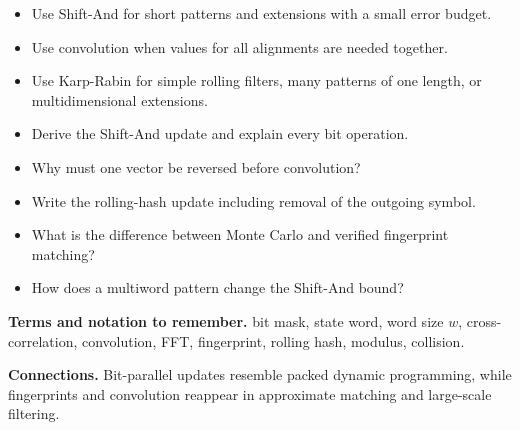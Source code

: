 \documentclass[11pt]{article}
\begin{document}
\begin{tcolorbox}[enhanced,breakable,title={Algorithm selection / when to use this},
  colback=Primary!3,colframe=Primary,fonttitle=\small\sffamily\bfseries,fontupper=\footnotesize,
  boxsep=0.6mm,left=1.5mm,right=1.5mm,top=1mm,bottom=1mm,before skip=3pt,after skip=3pt]
\begin{itemize}
  \item Use Shift-And for short patterns and extensions with a small error budget.
  \item Use convolution when values for all alignments are needed together.
  \item Use Karp-Rabin for simple rolling filters, many patterns of one length, or multidimensional extensions.
\end{itemize}
\end{tcolorbox}

\begin{tcolorbox}[enhanced,breakable,title={Self-test questions},
  colback=white,colframe=Accent,fonttitle=\small\sffamily\bfseries,fontupper=\footnotesize,
  boxsep=0.6mm,left=1.5mm,right=1.5mm,top=1mm,bottom=1mm,before skip=3pt,after skip=3pt]
\begin{itemize}
  \item Derive the Shift-And update and explain every bit operation.
  \item Why must one vector be reversed before convolution?
  \item Write the rolling-hash update including removal of the outgoing symbol.
  \item What is the difference between Monte Carlo and verified fingerprint matching?
  \item How does a multiword pattern change the Shift-And bound?
\end{itemize}
\end{tcolorbox}

{\footnotesize
\textbf{Terms and notation to remember.} bit mask, state word, word size $w$, cross-correlation, convolution, FFT, fingerprint, rolling hash, modulus, collision.

\textbf{Connections.} Bit-parallel updates resemble packed dynamic programming, while fingerprints and convolution reappear in approximate matching and large-scale filtering.
}
\end{document}

